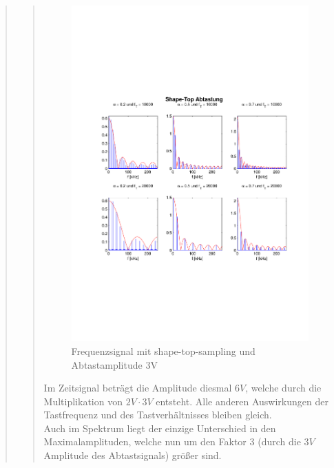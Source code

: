 \begin{quote}
\begin{quote}
  	    
  	    \begin{figure}[H]
    \centering
        \includegraphics[scale=0.7, trim = 0cm 0cm 0cm 0cm,
        clip]{./Bilder/shape-top-freq_3V}
            \caption{Frequenzsignal mit shape-top-sampling und Abtastamplitude
            3V}
  	    \end{figure}
  	    
  	    
  	    Im Zeitsignal beträgt die Amplitude diesmal $6V$, welche durch die
  	    Multiplikation von $2V \cdot 3V$ entsteht. Alle anderen Auswirkungen der
  	    Tastfrequenz und des Tastverhältnisses bleiben gleich.\\
  	    Auch im Spektrum liegt der einzige Unterschied in den Maximalamplituden,
  	    welche nun um den Faktor $3$ (durch die $3V$ Amplitude des Abtastsignals)
  	    größer sind.
  	    
  	    \vspace{1em}
  	    

\end{quote}
\end{quote}
